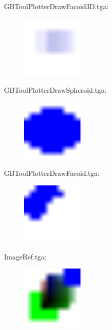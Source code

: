 GBToolPlotterDrawFacoid3D.tga:\\
\begin{center}
\begin{figure}[H]
\centering\includegraphics[width=3cm]{./GBToolPlotterDrawFacoid3D.png}\\
\end{figure}
\end{center}

GBToolPlotterDrawSpheroid.tga:\\
\begin{center}
\begin{figure}[H]
\centering\includegraphics[width=3cm]{./GBToolPlotterDrawSpheroid.png}\\
\end{figure}
\end{center}

GBToolPlotterDrawFacoid.tga:\\
\begin{center}
\begin{figure}[H]
\centering\includegraphics[width=3cm]{./GBToolPlotterDrawFacoid.png}\\
\end{figure}
\end{center}

ImageRef.tga:\\
\begin{center}
\begin{figure}[H]
\centering\includegraphics[width=3cm]{./ImageRef.png}\\
\end{figure}
\end{center}

